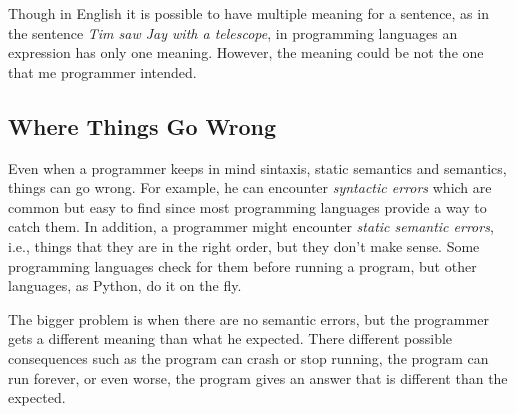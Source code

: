 \documentclass[a4paper]{article}
\begin{document}
Though in English it is possible to have multiple meaning for a sentence,
as in the sentence \textit{Tim saw Jay with a telescope}, in programming
languages an expression has only one meaning. However, the meaning could be not
the one that me programmer intended.

\subsection{Where Things Go Wrong}

Even when a programmer keeps in mind sintaxis, static semantics and semantics,
things can go wrong. For example, he can encounter \textit{syntactic errors}
which are common but easy to find since most programming languages provide a
way to catch them. In addition, a programmer might encounter \textit{static
semantic errors}, i.e., things that they are in the right order, but they
don't make sense. Some programming languages check for them before running a
program, but other languages, as Python, do it on the fly.

The bigger problem is when there are no semantic errors, but the programmer
gets a different meaning than what he expected. There different possible
consequences such as the program can crash or stop running, the program can
run forever, or even worse, the program gives an answer that is different than
the expected.
\end{document}
